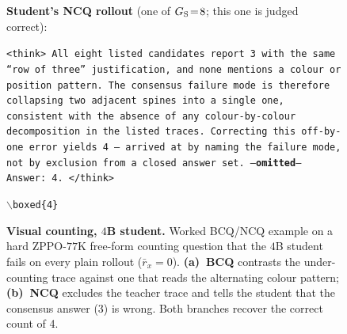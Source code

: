\begin{figure}[!p]
\begin{prompttemplatefig}
\textbf{Student's NCQ rollout} (one of $G_{\rm S}\!=\!8$; this one is judged correct):

\smallskip
\texttt{<think> All eight listed candidates report 3 with the same ``row of three'' justification, and none mentions a colour or position pattern. The consensus failure mode is therefore collapsing two adjacent spines into a single one, consistent with the absence of any colour-by-colour decomposition in the listed traces. Correcting this off-by-one error yields 4 -- arrived at by naming the failure mode, not by exclusion from a closed answer set. ---\textbf{omitted}--- Answer: 4. </think>}

\smallskip
\texttt{$\backslash$boxed\{4\}} \quad \textcolor{posgain}{\checkmark}
\end{prompttemplatefig}

\caption{\textbf{Visual counting, $4$B student.} Worked BCQ/NCQ example on a hard ZPPO-$77$K free-form counting question that the $4$B student fails on every plain rollout ($\bar{r}_x\!=\!0$). \textbf{(a)~BCQ} contrasts the under-counting trace against one that reads the alternating colour pattern; \textbf{(b)~NCQ} excludes the teacher trace and tells the student that the consensus answer (3) is wrong. Both branches recover the correct count of 4.}
\label{fig:appendix:bcq_ncq_books}
\end{figure}

